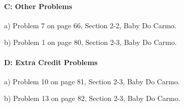 \documentclass[12pt]{article}
\begin{document}
\paragraph{C: Other Problems}
\begin{itemize}
{\item a) Problem 7 on page 66, Section 2-2, Baby Do Carmo.}
{\item b) Problem 1 on page 80, Section 2-3, Baby Do Carmo.}


\end{itemize}

\paragraph{D: Extra Credit Problems}
\begin{itemize}
{\item a) Problem 10 on page 81, Section 2-3, Baby Do Carmo.}
{\item b) Problem 13 on page 82, Section 2-3, Baby Do Carmo.}
\end{itemize}
\end{document}
